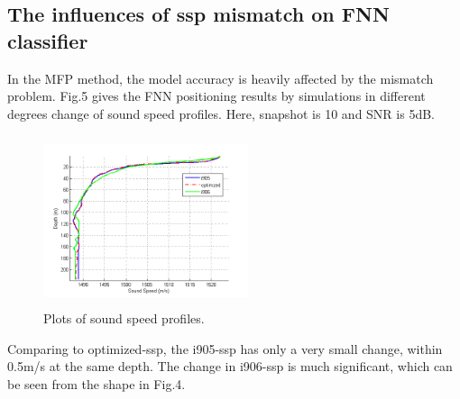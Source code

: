 \subsection{The influences of ssp mismatch on FNN classifier}
In the MFP method, the model accuracy is heavily affected by the mismatch problem\cite{tolstoy1989sensitivity,feuillade1989environmental,del1988effects}. Fig.5 gives the FNN positioning results by simulations in different degrees change of sound speed profiles. Here, snapshot is 10 and SNR is 5dB.
\begin{figure}
\includegraphics[width=6cm,height=5cm]{figure/ssp3}
\caption{Plots of sound speed profiles.}
\end{figure}
Comparing to optimized-ssp, the i905-ssp has only a very small change, within 0.5m/s at the same depth. The change in i906-ssp is much significant, which can be seen from the shape in Fig.4.
